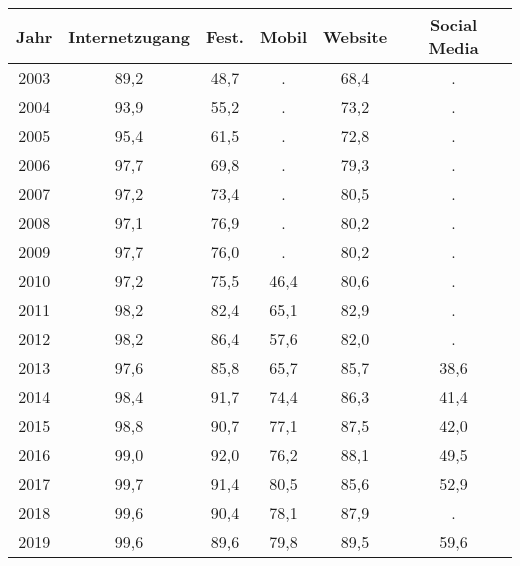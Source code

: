 \begin{tabular}{cccccc}
\toprule
Jahr        &  Internetzugang & Fest. & Mobil & Website & Social Media \\
\midrule
2003        &   89,2	&   48,7   &    .	  &   68,4    &    .      \\
2004        &   93,9	&   55,2   &    .	  &   73,2    &    .      \\
2005        &   95,4	&   61,5   &    .	  &   72,8    &    .      \\
2006        &   97,7	&   69,8   &    .	  &   79,3    &    .      \\
2007        &   97,2	&   73,4   &    .	  &   80,5    &    .      \\
2008        &   97,1	&   76,9   &    .	  &   80,2    &    .      \\
2009        &   97,7	&   76,0   &    .	  &   80,2    &    .      \\
2010        &   97,2	&   75,5   &    46,4  &   80,6    &    .      \\
2011        &   98,2	&   82,4   &    65,1  &   82,9    &    .      \\
2012        &   98,2	&   86,4   &    57,6  &   82,0    &    .      \\
2013        &   97,6	&   85,8   &    65,7  &   85,7    &    38,6   \\
2014        &   98,4	&   91,7   &    74,4  &   86,3    &    41,4   \\
2015        &   98,8	&   90,7   &    77,1  &   87,5    &    42,0   \\
2016        &   99,0	&   92,0   &    76,2  &   88,1    &    49,5   \\
2017        &   99,7	&   91,4   &    80,5  &   85,6    &    52,9   \\
2018        &   99,6	&   90,4   &    78,1  &   87,9    &    .      \\
2019        &   99,6	&   89,6   &    79,8  &   89,5    &    59,6   \\
\bottomrule
\end{tabular}